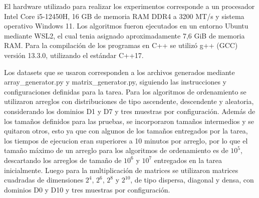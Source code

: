 El hardware utilizado para realizar los experimentos corresponde a un procesador Intel Core i5-12450H, 16 GB de memoria RAM DDR4 a 3200 MT/s y sistema operativo Windows 11. Los algoritmos fueron ejecutados en un entorno Ubuntu mediante WSL2, el cual tenia asignado aproximadamente 7,6 GiB de memoria RAM. Para la compilación de los programas en C++ se utilizó g++ (GCC) versión 13.3.0, utilizando el estándar C++17.

Los datasets que se usaron corresponden a los archivos generados mediante array\_generator.py y matrix\_generator.py, siguiendo las instrucciones y configuraciones definidas para la tarea. Para los algoritmos de ordenamiento se utilizaron arreglos con distribuciones de tipo ascendente, descendente y aleatoria, considerando los dominios D1 y D7 y tres muestras por configuración. Además de los tamaños definidos para las pruebas, se incorporaron tamaños intermedios y se quitaron otros, esto ya que con algunos de los tamaños entregados por la tarea, los tiempos de ejecucion eran superiores a 10 minutos por arreglo, por lo que el tamaño máximo de un arreglo para los algoritmos de ordenamiento es de $10^5$, descartando los arreglos de tamaño de $10^6$ y $10^7$ entregados en la tarea inicialmente. Luego para la multiplicación de matrices se utilizaron matrices cuadradas de dimensiones \(2^4\), \(2^6\), \(2^8\) y \(2^{10}\), de tipo dispersa, diagonal y densa, con dominios D0 y D10 y tres muestras por configuración.